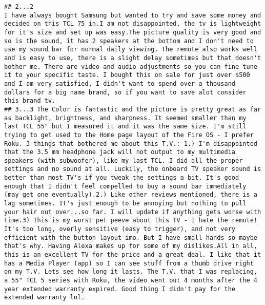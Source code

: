 \documentclass[
  11pt,
]{article}
\begin{document}
\begin{verbatim}
## 2...2                                                                                                                                                                                                                                                                                                                                                                                                                                                                                                                                                                                                                                                                                                                                                                                                                                           I have always bought Samsung but wanted to try and save some money and decided on this TCL 75 in.I am not disappointed, the tv is lightweight for it's size and set up was easy.The picture quality is very good and so is the sound, it has 2 speakers at the bottom and I don't need to use my sound bar for normal daily viewing. The remote also works well and is easy to use, there is a slight delay sometimes but that doesn't bother me. There are video and audio adjustments so you can fine tune it to your specific taste. I bought this on sale for just over $500 and I am very satisfied, I didn't want to spend over a thousand dollars for a big name brand, so if you want to save alot consider this brand tv.
## 3...3 The Color is fantastic and the picture is pretty great as far as backlight, brightness, and sharpness. It seemed smaller than my last TCL 55" but I measured it and it was the same size. I'm still trying to get used to the Home page layout of the Fire OS - I prefer Roku. 3 things that bothered me about this T.V.: 1.) I'm disappointed that the 3.5 mm headphone jack will not output to my multimedia speakers (with subwoofer), like my last TCL. I did all the proper settings and no sound at all. Luckily, the onboard TV speaker sound is better than most TV's if you tweak the settings a bit. It's good enough that I didn't feel compelled to buy a sound bar immediately (may get one eventually).2.) Like other reviews mentioned, there is a lag sometimes. It's just enough to be annoying but nothing to pull your hair out over...so far. I will update if anything gets worse with time.3) This is my worst pet peeve about this TV - I hate the remote! It's too long, overly sensitive (easy to trigger), and not very efficient with the button layout imo. But I have small hands so maybe that's why. Having Alexa makes up for some of my dislikes.All in all, this is an excellent TV for the price and a great deal. I like that it has a Media Player (app) so I can see stuff from a thumb drive right on my T.V. Lets see how long it lasts. The T.V. that I was replacing, a 55" TCL 5 series with Roku, the video went out 4 months after the 4 year extended warranty expired. Good thing I didn't pay for the extended warranty lol.

\end{verbatim}
\end{document}
